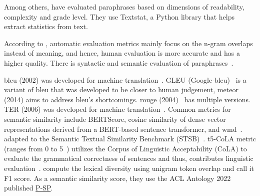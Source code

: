 Among others, \citet{Thomas_cross_topic_24} have evaluated paraphrases based on dimensions of readability, complexity and grade level.
They use Textstat, a Python library that helps extract statistics from text.

According to \citet{zhou_paraphrase_2021}, automatic evaluation metrics mainly focus on the n-gram overlaps instead of meaning, and hence, human evaluation is more accurate and has a higher quality.
There is syntactic and semantic evaluation of paraphrases~\citep{gohsen_captions_2023}.

\ac{bleu} (2002) was developed for machine translation~\citep{papineni_bleu_2001}.
GLEU (Google-\ac{bleu})~\citep{kurt_pehlivanoglu_comparative_2024} is a variant of \ac{bleu} that was developed to be closer to human judgement, \ac{meteor} (2014) aims to address \ac{bleu}'s shortcomings.
\ac{rouge} (2004)~\citep{lin_rouge_2004} has multiple versions.
TER (2006) was developed for machine translation~\citep{zhou_paraphrase_2021}.
Common metrics for semantic similarity include BERTScore, 
cosine similarity of dense vector representations derived from a BERT-based sentence transformer, 
and \ac{wmd}~\citep{gohsen_captions_2023}.
\citet{kurt_pehlivanoglu_comparative_2024} adapted to the Semantic Textual Similarity Benchmark (STSB)~\citep{kurt_pehlivanoglu_comparative_2024}.
\ac{t5}-CoLA metric (ranges from 0 to 5~\citep{kurt_pehlivanoglu_comparative_2024}) utilizes the Corpus of Linguistic Acceptability (CoLA) to evaluate the grammatical correctness of sentences and thus, 
contributes linguistic evaluation~\citep{kurt_pehlivanoglu_comparative_2024}.
\citet{krishna_paraphrasing_2023} compute the lexical diversity using unigram token overlap and call it F1 score.
As a semantic similarity score, they use the ACL Antology 2022 published \href{https://aclanthology.org/2022.emnlp-demos.38.pdf}{P-SP}.
